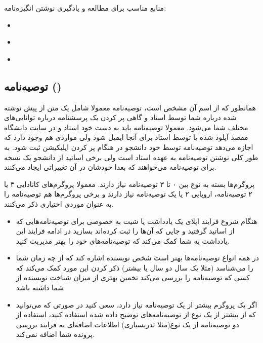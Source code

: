 منابع مناسب برای مطالعه و یادگیری نوشتن انگیزه‌نامه:

\begin{itemize}[leftmargin=1.5cm]
\item \href{https://www.reddit.com/r/StatementOfPurpose/comments/9k40n9/sop_tips_thread/}{}
\item \href{https://www.reddit.com/r/gradadmissions/comments/zn0u1d/resources_for_writing_a_statement_of_purpose/}{}
\item \href{https://cs-sop.notion.site/cs-sop/CS-PhD-Statements-of-Purpose-df39955313834889b7ac5411c37b958d}{}
\end{itemize}

\subsection{توصیه‌نامه ()}\label{ssec:recom}
همانطور که از اسم آن مشخص است، توصیه‌نامه معمولا شامل یک متن از پیش نوشته شده درباره شما توسط استاد و گاهی پر کردن یک پرسشنامه 
درباره توانایی‌های مختلف شما می‌شود. معمولا توصیه‌نامه باید به دست خود استاد و در سایت دانشگاه مقصد آپلود شده یا توسط استاد برای آنجا ایمیل
شود ولی مواردی هم وجود دارد که اجازه می‌دهد  توصیه‌نامه توسط خود دانشجو در هنگام پر کردن اپلیکیشن ثبت شود. 
به طور کلی نوشتن توصیه‌نامه به عهده استاد است ولی برخی اساتید از دانشجو یک نسخه  برای توصیه‌نامه می‌خواهند که بعدا خودشان 
در آن تغییراتی ایجاد می‌کنند. 

پروگرم‌ها بسته به نوع بین ۰ تا ۳ توصیه‌نامه نیاز دارند. معمولا پروگرم‌های کانادایی ۳ یا ۲ توصیه‌نامه، اروپایی ۲ یا یک توصیه‌نامه نیاز دارند و 
برخی پروگرم‌ها هم توصیه‌نامه را به عنوان موردی اختیاری ذکر می‌کنند. 

\begin{tipbox}
  \begin{itemize}
    \item   هنگام شروع فرایند اپلای یک یادداشت یا شیت به خصوصی برای توصیه‌نامه‌هایی که از اساتید گرفتید و جایی که آن‌ها را ثبت کرده‌اند بسازید
  در ادامه فرایند این یادداشت به شما کمک می‌کند که توصیه‌نامه‌های خود را بهتر مدیریت کنید.
    \item در همه انواع توصیه‌نامه‌ها بهتر است شخص نویسنده اشاره کند که از چه زمان شما را می‌شناسد (مثلا یک سال دو سال یا بیشتر) ذکر کردن
    این مورد کمک می‌کند که کسی که توصیه‌نامه را بررسی می‌کند تخمین بهتری از میزان شناخت نویسنده از شما داشته باشد
    \item اگر یک پروگرم بیشتر از یک توصیه‌نامه نیاز دارد، سعی کنید در صورتی که می‌توانید که از بیشتر از یک نوع از توصیه‌نامه‌های توضیح داده شده استفاده کنید، استفاده 
    از دو توصیه‌نامه از یک نوع(مثلا تدریسیاری) اطلاعات اضافه‌ای به فرایند بررسی پرونده شما اضافه نمی‌کند. 
  \end{itemize}

\end{tipbox}

